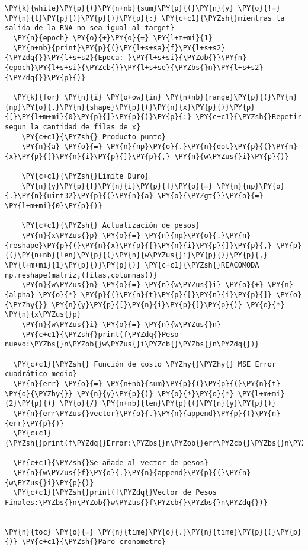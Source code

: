     \begin{tcolorbox}[breakable, size=fbox, boxrule=1pt, pad at break*=1mm,colback=cellbackground, colframe=cellborder]
\begin{Verbatim}[commandchars=\\\{\}]
\PY{k}{while}\PY{p}{(}\PY{n+nb}{sum}\PY{p}{(}\PY{n}{y} \PY{o}{!=} \PY{n}{t}\PY{p}{)}\PY{p}{)}\PY{p}{:} \PY{c+c1}{\PYZsh{}mientras la salida de la RNA no sea igual al target}
  \PY{n}{epoch} \PY{o}{+}\PY{o}{=} \PY{l+m+mi}{1}
  \PY{n+nb}{print}\PY{p}{(}\PY{l+s+sa}{f}\PY{l+s+s2}{\PYZdq{}}\PY{l+s+s2}{Epoca: }\PY{l+s+si}{\PYZob{}}\PY{n}{epoch}\PY{l+s+si}{\PYZcb{}}\PY{l+s+se}{\PYZbs{}n}\PY{l+s+s2}{\PYZdq{}}\PY{p}{)}

  \PY{k}{for} \PY{n}{i} \PY{o+ow}{in} \PY{n+nb}{range}\PY{p}{(}\PY{n}{np}\PY{o}{.}\PY{n}{shape}\PY{p}{(}\PY{n}{x}\PY{p}{)}\PY{p}{[}\PY{l+m+mi}{0}\PY{p}{]}\PY{p}{)}\PY{p}{:} \PY{c+c1}{\PYZsh{}Repetir segun la cantidad de filas de x}
    \PY{c+c1}{\PYZsh{} Producto punto}
    \PY{n}{a} \PY{o}{=} \PY{n}{np}\PY{o}{.}\PY{n}{dot}\PY{p}{(}\PY{n}{x}\PY{p}{[}\PY{n}{i}\PY{p}{]}\PY{p}{,} \PY{n}{w\PYZus{}i}\PY{p}{)}

    \PY{c+c1}{\PYZsh{}Limite Duro}
    \PY{n}{y}\PY{p}{[}\PY{n}{i}\PY{p}{]}\PY{o}{=} \PY{n}{np}\PY{o}{.}\PY{n}{uint32}\PY{p}{(}\PY{n}{a} \PY{o}{\PYZgt{}}\PY{o}{=} \PY{l+m+mi}{0}\PY{p}{)}

    \PY{c+c1}{\PYZsh{} Actualización de pesos}
    \PY{n}{x\PYZus{}p} \PY{o}{=} \PY{n}{np}\PY{o}{.}\PY{n}{reshape}\PY{p}{(}\PY{n}{x}\PY{p}{[}\PY{n}{i}\PY{p}{]}\PY{p}{,} \PY{p}{(}\PY{n+nb}{len}\PY{p}{(}\PY{n}{w\PYZus{}i}\PY{p}{)}\PY{p}{,} \PY{l+m+mi}{1}\PY{p}{)}\PY{p}{)} \PY{c+c1}{\PYZsh{}REACOMODA np.reshape(matriz,(filas,columnas))}
    \PY{n}{w\PYZus{}n} \PY{o}{=} \PY{n}{w\PYZus{}i} \PY{o}{+} \PY{n}{alpha} \PY{o}{*} \PY{p}{(}\PY{n}{t}\PY{p}{[}\PY{n}{i}\PY{p}{]} \PY{o}{\PYZhy{}} \PY{n}{y}\PY{p}{[}\PY{n}{i}\PY{p}{]}\PY{p}{)} \PY{o}{*} \PY{n}{x\PYZus{}p}
    \PY{n}{w\PYZus{}i} \PY{o}{=} \PY{n}{w\PYZus{}n}
    \PY{c+c1}{\PYZsh{}print(f\PYZdq{}Peso nuevo:\PYZbs{}n\PYZob{}w\PYZus{}i\PYZcb{}\PYZbs{}n\PYZdq{})}
 
  \PY{c+c1}{\PYZsh{} Función de costo \PYZhy{}\PYZhy{} MSE Error cuadrático medio}
  \PY{n}{err} \PY{o}{=} \PY{n+nb}{sum}\PY{p}{(}\PY{p}{(}\PY{n}{t} \PY{o}{\PYZhy{}} \PY{n}{y}\PY{p}{)} \PY{o}{*}\PY{o}{*} \PY{l+m+mi}{2}\PY{p}{)} \PY{o}{/} \PY{n+nb}{len}\PY{p}{(}\PY{n}{y}\PY{p}{)}
  \PY{n}{err\PYZus{}vector}\PY{o}{.}\PY{n}{append}\PY{p}{(}\PY{n}{err}\PY{p}{)}
  \PY{c+c1}{\PYZsh{}print(f\PYZdq{}Error:\PYZbs{}n\PYZob{}err\PYZcb{}\PYZbs{}n\PYZdq{})}

  \PY{c+c1}{\PYZsh{}Se añade al vector de pesos}
  \PY{n}{w\PYZus{}f}\PY{o}{.}\PY{n}{append}\PY{p}{(}\PY{n}{w\PYZus{}i}\PY{p}{)}
  \PY{c+c1}{\PYZsh{}print(f\PYZdq{}Vector de Pesos Finales:\PYZbs{}n\PYZob{}w\PYZus{}f\PYZcb{}\PYZbs{}n\PYZdq{})}


\PY{n}{toc} \PY{o}{=} \PY{n}{time}\PY{o}{.}\PY{n}{time}\PY{p}{(}\PY{p}{)} \PY{c+c1}{\PYZsh{}Paro cronometro}
\end{Verbatim}
\end{tcolorbox}

